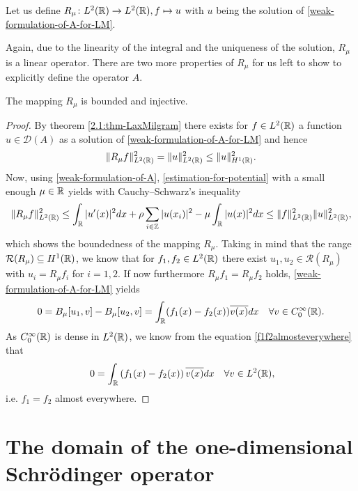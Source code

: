 \begin{definition}
	Let us define $R_{\mu} \colon L^{2}(\mathbb{R}) \rightarrow L^{2}(\mathbb{R}), f \mapsto u$ with $u$ being the solution of \eqref{weak-formulation-of-A-for-LM}.
\end{definition}
Again, due to the linearity of the integral and the uniqueness of the solution, $R_{\mu}$ is a linear operator. There are two more properties of $R_{\mu}$ for us left to show to explicitly define the operator $A$. 
\begin{theorem} \label{rmuinj}
	The mapping $R_{\mu}$ is bounded and injective.
	
	\begin{proof}
		By theorem \ref{2.1:thm-LaxMilgram} there exists for $f \in L^{2}(\mathbb{R})$ a function $u \in \mathcal{D}(A)$ as a solution of \eqref{weak-formulation-of-A-for-LM} and hence
		\[ \| R_{\mu} f \|_{L^{2}(\mathbb{R})}^{2} = \| u \|_{L^{2}(\mathbb{R})}^{2} \leq \| u \|_{H^{1}(\mathbb{R})}^{2}. \] 
		Now, using \eqref{weak-formulation-of-A}, \eqref{estimation-for-potential} with a small enough $\mu \in \mathbb{R}$ yields with Cauchy–Schwarz's inequality
		\[ \| R_{\mu} f \|_{L^{2}(\mathbb{R})}^{2} \leq \int_{\mathbb{R}} |u'(x)|^{2} dx + \rho \sum_{i \in \mathbb{Z}} |u(x_{i})|^{2} - \mu \int_{\mathbb{R}} |u(x)|^{2} dx \leq \| f \|_{L^{2}(\mathbb{R})}^{2} \| u \|_{L^{2}(\mathbb{R})}^{2}, \]	
		which shows the boundedness of the mapping $R_{\mu}$. Taking in mind that the range $\mathcal{R}(R_{\mu}) \subseteq H^{1}(\mathbb{R})$, we know that for $f_{1}, f_{2} \in L^{2}(\mathbb{R})$ there exist  $u_{1}, u_{2} \in \mathcal{R}(R_{\mu})$ with $u_{i} = R_{\mu} f_{i}$ for $i = 1, 2$. If now furthermore $R_{\mu} f_{1} = R_{\mu} f_{2}$ holds, \eqref{weak-formulation-of-A-for-LM} yields
		\begin{equation}
			0 = B_{\mu}[u_{1}, v] - B_{\mu}[u_{2}, v] = \int_{\mathbb{R}} (f_{1}(x) - f_{2}(x)) \overline{v(x)} dx \quad \forall v \in C_{0}^{\infty}(\mathbb{R}). \label{f1f2almosteverywhere}
		\end{equation} 
		As $C_{0}^{\infty}(\mathbb{R})$ is dense in $L^{2}(\mathbb{R})$, we know from the equation \eqref{f1f2almosteverywhere} that
		\[ 0 = \int_{\R} \left(f_{1}(x) - f_{2}(x)\right) \overline{v(x)} dx \quad \forall v \in L^{2}(\R), \]
		i.e. $f_{1} = f_{2}$ almost everywhere.
	\end{proof}
\end{theorem}

\section{The domain of the one-dimensional Schrödinger operator} \label{sec:3.2}


